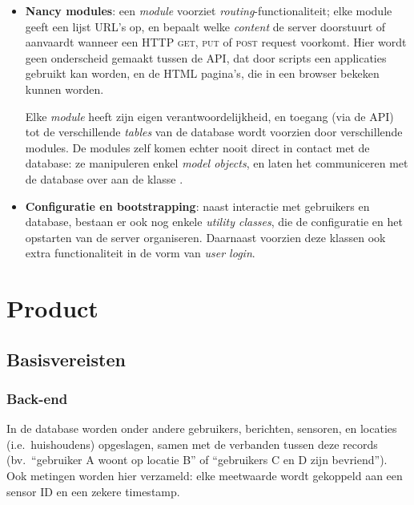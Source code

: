 \documentclass[12pt,draft,parskip=full]{article}
\begin{document}
\begin{itemize}
\item \textbf{Nancy modules}: een \emph{module} voorziet 
\emph{routing}-functionaliteit; elke module geeft een lijst URL's op, en 
bepaalt welke \emph{content} de server doorstuurt of aanvaardt wanneer een HTTP 
\textsc{get}, \textsc{put} of \textsc{post} request voorkomt. Hier wordt geen 
onderscheid gemaakt tussen de API, dat door scripts een applicaties gebruikt 
kan worden, en de HTML pagina's, die in een browser bekeken kunnen worden.

Elke \emph{module} heeft zijn eigen verantwoordelijkheid, en toegang (via de 
API) tot de verschillende \emph{tables} van de database wordt voorzien door 
verschillende modules. De {modules} zelf komen echter nooit direct in 
contact met de database: ze manipuleren enkel \emph{model objects}, en laten 
het communiceren met de database over aan de klasse .

\item \textbf{Configuratie en bootstrapping}: naast interactie met gebruikers en database, bestaan er ook nog enkele \emph{utility classes}, die de configuratie en het opstarten van de server organiseren. Daarnaast voorzien deze klassen ook extra functionaliteit in de vorm van \emph{user login}. 

\end{itemize}
\section{Product}
\subsection{Basisvereisten}
\subsubsection{Back-end}
In de database worden onder andere gebruikers, berichten, sensoren, en locaties 
(i.e.\ huishoudens) 
opgeslagen, samen met de verbanden tussen deze records (bv.\ ``gebruiker A 
woont op locatie B'' of ``gebruikers C en D zijn bevriend''). Ook metingen
worden hier verzameld: elke meetwaarde wordt gekoppeld aan een sensor ID en een 
zekere timestamp.
\end{document}
